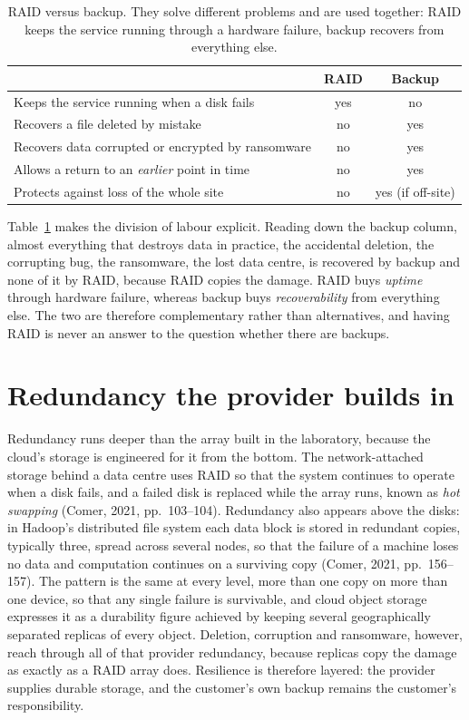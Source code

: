 \begin{table}[htbp]
\centering
\small
\begin{tabular}{@{}p{7.2cm} c c@{}}
\toprule
& \textbf{RAID} & \textbf{Backup} \\
\midrule
Keeps the service running when a disk fails & yes & no \\
Recovers a file deleted by mistake & no & yes \\
Recovers data corrupted or encrypted by ransomware & no & yes \\
Allows a return to an \emph{earlier} point in time & no & yes \\
Protects against loss of the whole site & no & yes (if off-site) \\
\bottomrule
\end{tabular}
\caption{RAID versus backup. They solve different problems and are used
together: RAID keeps the service running through a hardware failure, backup
recovers from everything else.}
\label{tab:raidbackup}
\end{table}

Table~\ref{tab:raidbackup} makes the division of labour explicit. Reading
down the backup column, almost everything that destroys data in practice,
the accidental deletion, the corrupting bug, the ransomware, the lost data
centre, is recovered by backup and none of it by RAID, because RAID copies
the damage. RAID buys \emph{uptime} through hardware failure, whereas backup
buys \emph{recoverability} from everything else. The two are therefore
complementary rather than alternatives, and having RAID is never an answer
to the question whether there are backups.

\section{Redundancy the provider builds in}

Redundancy runs deeper than the array built in the laboratory, because the
cloud's storage is engineered for it from the bottom. The network-attached
storage behind a data centre uses RAID so that the system continues to
operate when a disk fails, and a failed disk is replaced while the array
runs, known as \emph{hot swapping} (Comer, 2021, pp.~103--104). Redundancy
also appears above the disks: in Hadoop's distributed file system each data
block is stored in redundant copies, typically three, spread across several
nodes, so that the failure of a machine loses no data and computation
continues on a surviving copy (Comer, 2021, pp.~156--157). The pattern is
the same at every level, more than one copy on more than one device, so that
any single failure is survivable, and cloud object storage expresses it as a
durability figure achieved by keeping several geographically separated
replicas of every object. Deletion, corruption and ransomware, however,
reach through all of that provider redundancy, because replicas copy the
damage as exactly as a RAID array does. Resilience is therefore layered: the
provider supplies durable storage, and the customer's own backup remains the
customer's responsibility.

